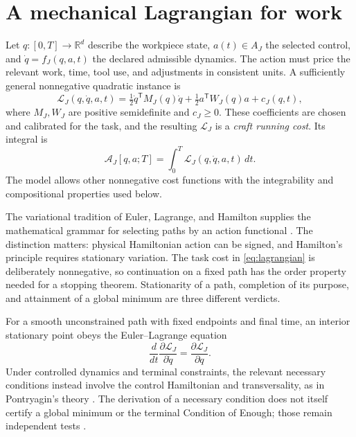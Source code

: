 \documentclass[11pt,letterpaper]{article}
\theoremstyle{definition}\newtheorem{definition}{Definition}
\newcommand{\Act}{\mathcal A}
\newcommand{\Lag}{\mathscr L}
\begin{document}
\section{A mechanical Lagrangian for work}
Let $q:[0,T]\to\mathbb R^d$ describe the workpiece state, $a(t)\in A_J$ the selected control, and $\dot q=f_J(q,a,t)$ the declared admissible dynamics. The action must price the relevant work, time, tool use, and adjustments in consistent units. A sufficiently general nonnegative quadratic instance is
\begin{equation}\label{eq:lagrangian}
\boxed{\Lag_J(q,\dot q,a,t)=
\tfrac12\dot q^{\mathsf T}M_J(q)\dot q+
\tfrac12a^{\mathsf T}W_J(q)a+c_J(q,t),}
\end{equation}
where $M_J,W_J$ are positive semidefinite and $c_J\ge0$. These coefficients are chosen and calibrated for the task, and the resulting $\Lag_J$ is a \emph{craft running cost}. Its integral is
\begin{equation}\label{eq:action}
\boxed{\Act_J[q,a;T]=\int_0^T\Lag_J(q,\dot q,a,t)\,dt.}
\end{equation}
The model allows other nonnegative cost functions with the integrability and compositional properties used below.

The variational tradition of Euler, Lagrange, and Hamilton supplies the mathematical grammar for selecting paths by an action functional \cite{euler,lagrange,hamilton}. The distinction matters: physical Hamiltonian action can be signed, and Hamilton's principle requires stationary variation. The task cost in \eqref{eq:lagrangian} is deliberately nonnegative, so continuation on a fixed path has the order property needed for a stopping theorem. Stationarity of a path, completion of its purpose, and attainment of a global minimum are three different verdicts.

For a smooth unconstrained path with fixed endpoints and final time, an interior stationary point obeys the Euler--Lagrange equation
\begin{equation}\label{eq:EL}
\frac{d}{dt}\frac{\partial\Lag_J}{\partial\dot q}
=\frac{\partial\Lag_J}{\partial q}.
\end{equation}
Under controlled dynamics and terminal constraints, the relevant necessary conditions instead involve the control Hamiltonian and transversality, as in Pontryagin's theory \cite{pontryagin}. The derivation of a necessary condition does not itself certify a global minimum or the terminal Condition of Enough; those remain independent tests \cite{weierstrass,bolza,tonelli}.
\end{document}
